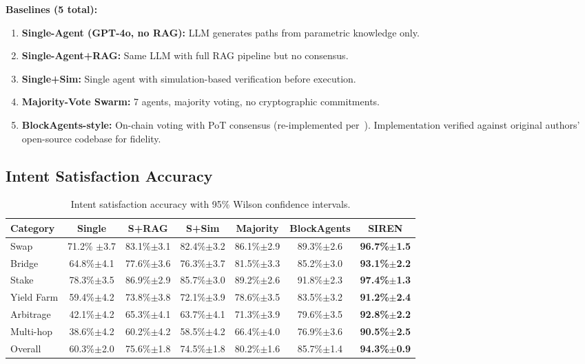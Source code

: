 \documentclass[11pt]{article}
\begin{document}
\textbf{Baselines (5 total):}
\begin{enumerate}
  \item \textbf{Single-Agent (GPT-4o, no RAG):} LLM generates paths from parametric knowledge only.
  \item \textbf{Single-Agent+RAG:} Same LLM with full RAG pipeline but no consensus.
  \item \textbf{Single+Sim:} Single agent with simulation-based verification before execution.
  \item \textbf{Majority-Vote Swarm:} 7 agents, majority voting, no cryptographic commitments.
  \item \textbf{BlockAgents-style:} On-chain voting with PoT consensus (re-implemented per~\cite{blockagents}). Implementation verified against original authors' open-source codebase for fidelity.
\end{enumerate}

\subsection{Intent Satisfaction Accuracy}

\begin{table}[t]
\centering
\caption{Intent satisfaction accuracy with 95\% Wilson confidence intervals.}
\label{tab:satisfaction}
\begin{tabular}{lcccccc}
\toprule
\textbf{Category} & \textbf{Single} & \textbf{S+RAG} & \textbf{S+Sim} & \textbf{Majority} & \textbf{BlockAgents} & \textbf{SIREN} \\
\midrule
Swap        & 71.2\% $\pm$3.7 & 83.1\%$\pm$3.1 & 82.4\%$\pm$3.2 & 86.1\%$\pm$2.9 & 89.3\%$\pm$2.6 & \textbf{96.7\%$\pm$1.5} \\
Bridge      & 64.8\%$\pm$4.1 & 77.6\%$\pm$3.6 & 76.3\%$\pm$3.7 & 81.5\%$\pm$3.3 & 85.2\%$\pm$3.0 & \textbf{93.1\%$\pm$2.2} \\
Stake       & 78.3\%$\pm$3.5 & 86.9\%$\pm$2.9 & 85.7\%$\pm$3.0 & 89.2\%$\pm$2.6 & 91.8\%$\pm$2.3 & \textbf{97.4\%$\pm$1.3} \\
Yield Farm  & 59.4\%$\pm$4.2 & 73.8\%$\pm$3.8 & 72.1\%$\pm$3.9 & 78.6\%$\pm$3.5 & 83.5\%$\pm$3.2 & \textbf{91.2\%$\pm$2.4} \\
Arbitrage   & 42.1\%$\pm$4.2 & 65.3\%$\pm$4.1 & 63.7\%$\pm$4.1 & 71.3\%$\pm$3.9 & 79.6\%$\pm$3.5 & \textbf{92.8\%$\pm$2.2} \\
Multi-hop   & 38.6\%$\pm$4.2 & 60.2\%$\pm$4.2 & 58.5\%$\pm$4.2 & 66.4\%$\pm$4.0 & 76.9\%$\pm$3.6 & \textbf{90.5\%$\pm$2.5} \\
\midrule
Overall     & 60.3\%$\pm$2.0 & 75.6\%$\pm$1.8 & 74.5\%$\pm$1.8 & 80.2\%$\pm$1.6 & 85.7\%$\pm$1.4 & \textbf{94.3\%$\pm$0.9} \\
\bottomrule
\end{tabular}
\end{table}
\end{document}
